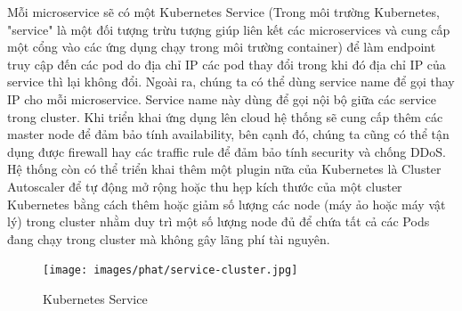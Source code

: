 \noindent Mỗi microservice sẽ có một Kubernetes Service (Trong môi trường Kubernetes, "service" là một đối tượng trừu tượng giúp liên kết các microservices và cung cấp một cổng vào các ứng dụng chạy trong môi trường container) để làm endpoint truy cập đến các pod do địa chỉ IP các pod thay đổi trong khi đó địa chỉ IP của service thì lại không đổi. Ngoài ra, chúng ta có thể dùng service name để gọi thay IP cho mỗi microservice. Service name này dùng để gọi nội bộ giữa các service trong cluster. Khi triển khai ứng dụng lên cloud hệ thống sẽ cung cấp thêm các master node để đảm bảo tính availability, bên cạnh đó, chúng ta cũng có thể tận dụng được firewall hay các traffic rule để đảm bảo tính security và chống DDoS.\\[0.5cm]
\noindent Hệ thống còn có thể triển khai thêm một plugin nữa của Kubernetes là Cluster Autoscaler để tự động mở rộng hoặc thu hẹp kích thước của một cluster Kubernetes bằng cách thêm hoặc giảm số lượng các node (máy ảo hoặc máy vật lý) trong cluster nhằm duy trì một số lượng node đủ để chứa tất cả các Pods đang chạy trong cluster mà không gây lãng phí tài nguyên.
 \begin{figure}[H]
    \begin{center}
    \texttt{[image: images/phat/service-cluster.jpg]}
    \vspace*{7mm}
    \caption{Kubernetes Service}
    \end{center}
    \label{}
\end{figure}

